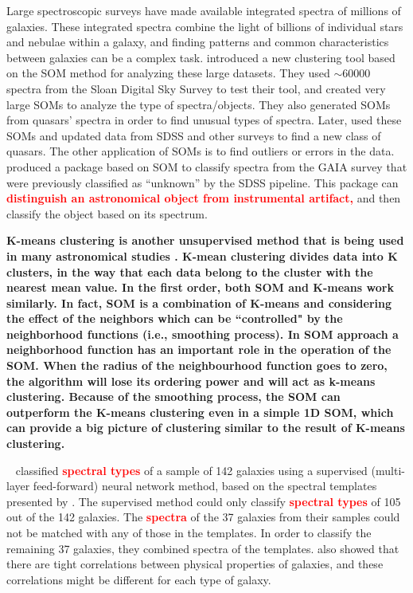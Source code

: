 Large spectroscopic surveys have made available integrated spectra of millions of galaxies.
These integrated spectra combine the light of billions of individual stars and nebulae within a galaxy, and
finding patterns and common characteristics between galaxies can be a complex task.
\citet{In12} introduced a new clustering tool based on the SOM method for analyzing these large datasets.
They used $\sim 60000$ spectra from the Sloan Digital Sky Survey \citep[SDSS;][]{Abazajian09} to test their tool, and created very large SOMs to analyze the type of spectra/objects.
They also generated SOMs from quasars' spectra in order to find unusual types of spectra. 
Later, \citet{Meusinger16} used these SOMs and updated data from SDSS and other surveys to find a new class of quasars.
The other application of SOMs is to find outliers or errors in the data.
\citet{Fustes13} produced a package based on SOM to classify spectra from the GAIA survey that were previously classified as ``unknown'' by the SDSS pipeline. This package can \textbf{\textcolor{red}{distinguish an astronomical object from instrumental artifact,}} and then classify the object based on its spectrum.

\textbf{K-means clustering is another unsupervised method that is being used in many astronomical studies \citep[e.g.][]{DAbrusco12,Ordov14,Boersma14,Aycha16}.
K-mean clustering divides data into K clusters, in the way that each data belong to the cluster with the nearest mean value.
In the first order, both SOM and K-means work similarly.
In fact, SOM is a combination of K-means and considering the effect of the neighbors which can be ``controlled" by the neighborhood functions (i.e., smoothing process). 
In SOM approach a neighborhood function has an important role in the operation of the SOM. 
When the radius of the neighbourhood function goes to zero, the algorithm will lose its ordering power and will act as k-means clustering.
Because of the smoothing process, the SOM can outperform the K-means clustering even in a simple 1D SOM, which can provide a big picture of clustering similar to the result of K-means clustering.}

~\citet[][hereafter ]{Hossein12} classified \textbf{\textcolor{red}{spectral types}} of a sample of 142 galaxies using a supervised (multi-layer feed-forward) neural network method, based on the spectral templates presented by .
The supervised method could only classify \textbf{\textcolor{red}{spectral types}} of 105 out of the 142 galaxies.
The \textbf{\textcolor{red}{spectra}} of the 37 galaxies from their samples could not be matched with any of those in the  templates. 
In order to classify the remaining 37 galaxies, they combined spectra of the  templates.
 also showed that there are tight correlations between physical properties of galaxies, and these correlations might be different for each type of galaxy.

